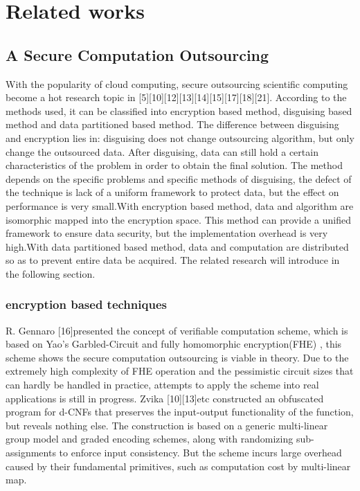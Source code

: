 \documentclass[runningheads,a4paper]{llncs}
\begin{document}
\section{Related works} 
\subsection{A Secure Computation Outsourcing}
With the popularity of cloud computing, secure outsourcing scientific computing become a hot research topic in [5][10][12][13][14][15][17][18][21]. According to the methods used, it can be classified into encryption based method, disguising based method and data partitioned based method.
The difference between disguising and encryption lies in: disguising does not change outsourcing algorithm, but only change the outsourced data. After disguising, data can still hold a certain characteristics of the problem in order to obtain the final solution. The method depends on the specific problems and specific methods of disguising, the defect of the technique is lack of a uniform framework to protect data, but the effect on performance is very small.With encryption based method, data and algorithm are isomorphic mapped into the encryption space. This method can provide a unified framework to ensure data security, but the implementation overhead is very high.With data partitioned based method, data and computation are distributed so as to prevent entire data be acquired.    
The related research will introduce in the following section.
\subsubsection{encryption based techniques}
R. Gennaro [16]presented the concept of verifiable computation scheme, which is based on Yao’s Garbled-Circuit and fully homomorphic encryption(FHE) , this scheme shows the secure computation outsourcing is viable in theory. Due to the extremely high complexity of FHE operation and the pessimistic circuit sizes that can hardly be handled in practice, attempts to apply the scheme into real applications is still in progress.
Zvika [10][13]etc constructed an obfuscated program for d-CNFs that preserves the input-output functionality of the function, but reveals nothing else. The construction is based on a generic multi-linear group model and graded encoding schemes, along with randomizing sub-assignments to enforce input consistency. But the scheme incurs large overhead caused by their fundamental primitives, such as computation cost by multi-linear map.
\end{document}
